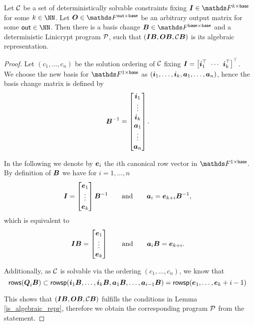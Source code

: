 \begin{lemma}
\label{det_solvable_lemma}
    Let $\C$ be a set of deterministically solvable constraints fixing $\Inp \in \F^{k \times \base}$ for some $k \in \NN$.
    Let $\O \in \F^{\out \times \base}$ be an arbitrary output matrix for some $\out \in \NN$.
    Then there is a basis change $\B \in \F^{\base \times \base}$
    and a deterministic Linicrypt program $\P$,
    such that $(\Inp \B, \O \B, \C \B)$ is its algebraic representation.
\end{lemma}

\begin{proof}
Let $(c_1, \dots, c_n)$ be the solution ordering of $\C$ fixing $\I = \mtdts \vi k$.
We choose the new basis for $\Frowsp$ as $(\dts \vi k, \dts \va n)$, hence the basis change matrix is defined by
\[
    \B^{-1} = 
    \begin{bmatrix}
\vi_1 \\
\vdots \\
\vi_k \\
\va_1 \\
\vdots \\
\va_n
    \end{bmatrix}.
\]

In the following we denote by $\v e_i$ the $i$th canonical row vector in $\Frowsp$.
By definition of $\B$ we have for $i=1, \dots, n$
\begin{equation*}
\I = \begin{bmatrix}
    \v e_1 \\
    \vdots \\
    \v e_k
\end{bmatrix} \B^{-1}
\qquad \textrm{and} \qquad
\va_i = \v e_{k+i} \B^{-1},
\end{equation*}
which is equivalent to
\begin{equation*}
\I \B = \begin{bmatrix}
    \v e_1 \\
    \vdots \\
    \v e_k
\end{bmatrix}
\qquad \textrm{and} \qquad
\va_i \B = \v e_{k+i}.
\end{equation*}

Additionally, as $\C$ is solvable via the ordering $(c_1, \dots, c_n)$,
we know that 
\[
\rows(\Q_i \B) \subset \rowsp(\vi_1 \B, \dots, \vi_k \B, \va_1 \B, \dots, \va_{i-1} \B) = \rowsp(\dts \ve k+i-1)
\]

This shows that $(\I\B, \O\B, \C\B)$ fulfills the conditions in Lemma \ref{is_algebraic_repr},
therefore we obtain the corresponding program $\P$ from the statement.
\end{proof}


